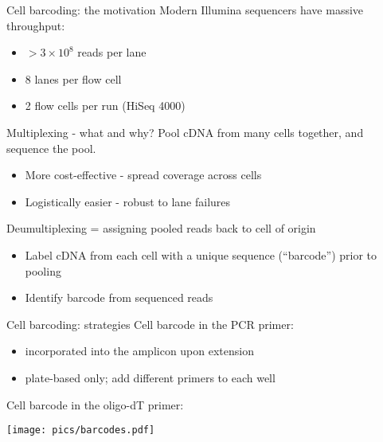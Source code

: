 \documentclass{beamer}
\begin{document}
\begin{frame}{Cell barcoding: the motivation}
Modern Illumina sequencers have massive throughput:
\begin{itemize}
\item $> 3 \times 10^8$ reads per lane 
\item 8 lanes per flow cell
\item 2 flow cells per run (HiSeq 4000)
\end{itemize}
\pause
\begin{exampleblock}{Multiplexing - what and why?}
Pool cDNA from many cells together, and sequence the pool.
\begin{itemize}
\item More cost-effective - spread coverage across cells
\item Logistically easier - robust to lane failures
\end{itemize}
\end{exampleblock}
\pause
Deumultiplexing = assigning pooled reads back to cell of origin
\begin{itemize}
\item Label cDNA from each cell with a unique sequence (``barcode'') prior to pooling
\item Identify barcode from sequenced reads
\end{itemize}
\end{frame}

\begin{frame}{Cell barcoding: strategies}
Cell barcode in the PCR primer:
\begin{itemize}
\item incorporated into the amplicon upon extension 
\item plate-based only; add different primers to each well
\end{itemize}
Cell barcode in the oligo-dT primer:
\begin{center}
\texttt{[image: pics/barcodes.pdf]}
\end{center}
\end{frame}
\end{document}
